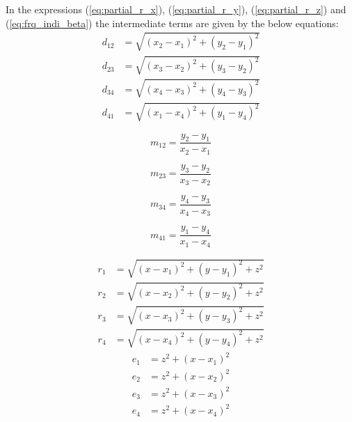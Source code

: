 In the expressions (\ref{eq:partial_r_x}), (\ref{eq:partial_r_y}), (\ref{eq:partial_r_z}) and (\ref{eq:frq_indi_beta}) the intermediate terms are given by the below equations:
\begin{align}
    d_{12} &= \sqrt{(x_2-x_1)^2+(y_2-y_1)^2}\\
    d_{23} &= \sqrt{(x_3-x_2)^2+(y_3-y_2)^2}\\
    d_{34} &= \sqrt{(x_4-x_3)^2+(y_4-y_3)^2}\\
    d_{41} &= \sqrt{(x_1-x_4)^2+(y_1-y_4)^2}
\end{align}
\newpage
\noindent\begin{minipage}{.5\linewidth}
    \begin{equation}
        m_{12} =\frac{y_2-y_1}{x_2-x_1}
    \end{equation}
    \end{minipage}%
    \begin{minipage}{.5\linewidth}
    \begin{equation}
        m_{23} =\frac{y_3-y_2}{x_3-x_2}
    \end{equation}
\end{minipage}
\noindent\begin{minipage}{.5\linewidth}
    \begin{equation}
        m_{34} =\frac{y_4-y_3}{x_4-x_3}
    \end{equation}
    \end{minipage}%
    \begin{minipage}{.5\linewidth}
    \begin{equation}
        m_{41} =\frac{y_1-y_4}{x_1-x_4}
    \end{equation}
\end{minipage}
\begin{align}
    r_1 &= \sqrt{(x-x_1)^2+(y-y_1)^2+z^2}\\
    r_2 &= \sqrt{(x-x_2)^2+(y-y_2)^2+z^2}\\
    r_3 &= \sqrt{(x-x_3)^2+(y-y_3)^2+z^2}\\
    r_4 &= \sqrt{(x-x_4)^2+(y-y_4)^2+z^2}
\end{align}
\begin{align}
    e_1 &= z^2+(x-x_1)^2\\
    e_2 &= z^2+(x-x_2)^2\\
    e_3 &= z^2+(x-x_3)^2\\
    e_4 &= z^2+(x-x_4)^2
\end{align}

